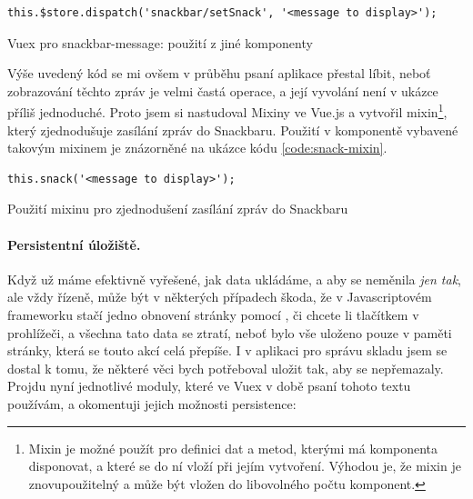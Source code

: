 \begin{listing}[h]
\begin{verbatim}
this.$store.dispatch('snackbar/setSnack', '<message to display>');
\end{verbatim}
\caption{Vuex pro snackbar-message: použití z jiné komponenty} \label{code:vuex-snack-use}
\end{listing}

Výše uvedený kód se mi ovšem v průběhu psaní aplikace přestal líbit, neboť zobrazování těchto zpráv je velmi častá operace, a její vyvolání není v ukázce příliš jednoduché. Proto jsem si nastudoval Mixiny ve Vue.js \cite{vue-mixin} a vytvořil mixin\footnote{Mixin je možné použít pro definici dat a metod, kterými má komponenta disponovat, a které se do ní vloží při jejím vytvoření. Výhodou je, že mixin je znovupoužitelný a může být vložen do libovolného počtu komponent.}, který zjednodušuje zasílání zpráv do Snackbaru. Použití v komponentě vybavené takovým mixinem je znázorněné na ukázce kódu \ref{code:snack-mixin}.

\begin{listing}[h]
\begin{verbatim}
this.snack('<message to display>');
\end{verbatim}
\caption{Použití mixinu pro zjednodušení zasílání zpráv do Snackbaru} \label{code:snack-mixin}
\end{listing}

\paragraph{Persistentní úložiště.} Když už máme efektivně vyřešené, jak data ukládáme, a aby se neměnila \emph{jen tak}, ale vždy řízeně, může být v některých případech škoda, že v Javascriptovém frameworku stačí jedno obnovení stránky pomocí ,  či chcete li tlačítkem v prohlížeči, a všechna tato data se ztratí, neboť bylo vše uloženo pouze v paměti stránky, která se touto akcí celá přepíše. I v aplikaci pro správu skladu jsem se dostal k tomu, že některé věci bych potřeboval uložit tak, aby se nepřemazaly. Projdu nyní jednotlivé moduly, které ve Vuex v době psaní tohoto textu používám, a okomentuji jejich možnosti persistence:

